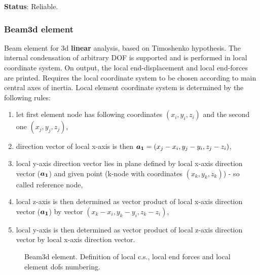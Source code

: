 \documentclass[12pt,dvips]{article}
\newcommand{\mbf}[1]{\mbox{\boldmath$#1$}}
\newcommand{\descitem}[1]{{\noindent \bf #1}:}
\begin{document}
\descitem{Status} Reliable.

\subsubsection{Beam3d element}
Beam element for 3d {\bf linear} analysis, based on Timoshenko hypothesis. The internal condensation
of arbitrary DOF is supported and is performed in local coordinate
system. On output, the local end-displacement and local end-forces are
printed. Requires the local coordinate system to be chosen according
to main central axes of inertia. Local element 
coordinate system is determined by the following rules:
\begin{enumerate}
\item let first element node has following coordinates $(x_i, y_i, z_i)$
and the second one $(x_j, y_j, z_j)$,
\item direction vector of local x-axis is then $\mbf{a_1} = (x_j-x_i, y_j-y_i, z_j-z_i)$,
\item local y-axis direction vector lies in plane defined by local
x-axis direction vector ($\mbf{a_1}$) and given
point (k-node with coordinates $(x_k, y_k, z_k)$) - so called reference node,
\item local z-axis is then determined as vector product of local
x-axis direction vector ($\mbf{a_1}$) by vector $(x_k-x_i, y_k-y_i, z_k-z_i)$,
\item local y-axis is then determined as vector product of local
z-axis direction vector by local x-axis direction vector. 
\end{enumerate}
\begin{figure}[tb]
\begin{center}\end{center}
\caption{Beam3d element. Definition of local c.s., local end forces
and local element dofs numbering.}
\label{beam3dfig}
\end{figure}
\end{document}
